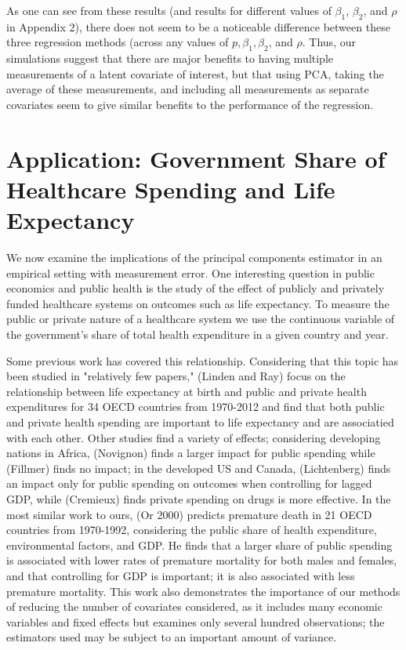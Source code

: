 \documentclass[12pt]{article}
\begin{document}
        \clearpage

        

        As one can see from these results (and results for different values of $\beta_1$, $\beta_2$, and $\rho$ in Appendix 2), there does not seem to be a noticeable difference between these three regression methods (across any values of $p, \beta_1,\beta_2$, and $\rho$. Thus, our simulations suggest that there are major benefits to having multiple measurements of a latent covariate of interest, but that using PCA, taking the average of these measurements, and including all measurements as separate covariates seem to give similar benefits to the performance of the regression.


    \section*{Application: Government Share of Healthcare Spending and Life Expectancy}

        We now examine the implications of the principal components estimator in an empirical setting with measurement error. One interesting question in public economics and public health is the study of the effect of publicly and privately funded healthcare systems on outcomes such as life expectancy. To measure the public or private nature of a healthcare system we use the continuous variable of the government's share of total health expenditure in a given country and year.

        Some previous work has covered this relationship. Considering that this topic has been studied in "relatively few papers," (Linden and Ray) focus on the relationship between life expectancy at birth and public and private health expenditures for 34 OECD countries from 1970-2012 and find that both public and private health spending are important to life expectancy and are associatied with each other. Other studies find a variety of effects; considering developing nations in Africa, (Novignon) finds a larger impact for public spending while (Fillmer) finds no impact; in the developed US and Canada, (Lichtenberg) finds an impact only for public spending on outcomes when controlling for lagged GDP, while (Cremieux) finds private spending on drugs is more effective. In the most similar work to ours, (Or 2000) predicts premature death in 21 OECD countries from 1970-1992, considering the public share of health expenditure, environmental factors, and GDP. He finds that a larger share of public spending is associated with lower rates of premature mortality for both males and females, and that controlling for GDP is important; it is also associated with less premature mortality. This work also demonstrates the importance of our methods of reducing the number of covariates considered, as it includes many economic variables and fixed effects but examines only several hundred observations; the estimators used may be subject to an important amount of variance.
\end{document}
